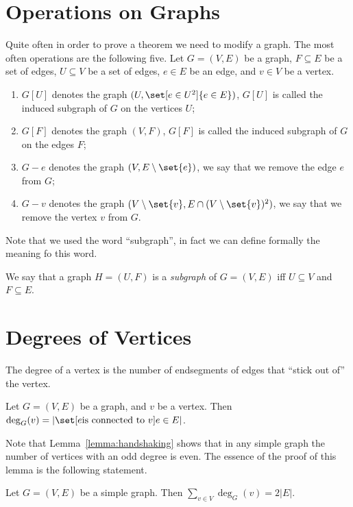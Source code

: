 \section{Operations on Graphs}
Quite often in order to prove a theorem we need to modify a graph. The most
often operations are the following five. Let $G = (V, E)$ be a graph,
$F \subseteq E$ be a set of edges, $U \subseteq V$ be a set of edges,
$e \in E$ be an edge, and $v \in V$ be a vertex.
\begin{enumerate}
  \item $G[U]$ denotes the graph $(U, \set[e \in U^2]{e \in E})$,
    $G[U]$ is called the induced subgraph of $G$ on the vertices $U$;
  \item $G[F]$ denotes the graph $(V, F)$, $G[F]$ is called the induced
    subgraph of $G$ on the edges $F$;
  \item $G - e$ denotes the graph $(V, E \setminus \set{e})$, we say that we
    remove the edge $e$ from $G$;
  \item $G - v$ denotes the graph
    $(V \setminus \set{v}, E \cap (V \setminus \set{v})^2)$, we say that we
    remove the vertex $v$ from $G$.
\end{enumerate}

Note that we used the word ``subgraph'', in fact we can define formally the
meaning fo this word.
\begin{definition}
  We say that a graph $H = (U, F)$ is a \emph{subgraph} of $G = (V, E)$ iff
  $U \subseteq V$ and $F \subseteq E$.
\end{definition}

\section{Degrees of Vertices}
The degree of a vertex is the number of endsegments of edges that ``stick out
of'' the vertex.
\begin{definition}
  Let $G = (V, E)$ be a graph, and $v$ be a vertex. Then
  $\deg_G(v) = |\set[{e \text{is connected to } v}]{e \in E}|$.
\end{definition}

Note that Lemma~\ref{lemma:handshaking} shows that in any simple graph the
number of vertices with an odd degree is even.
The essence of the proof of this lemma is the following statement.
\begin{theorem}
  Let $G = (V, E)$ be a simple graph. Then $\sum_{v \in V} \deg_G(v) = 2|E|$.
\end{theorem}

